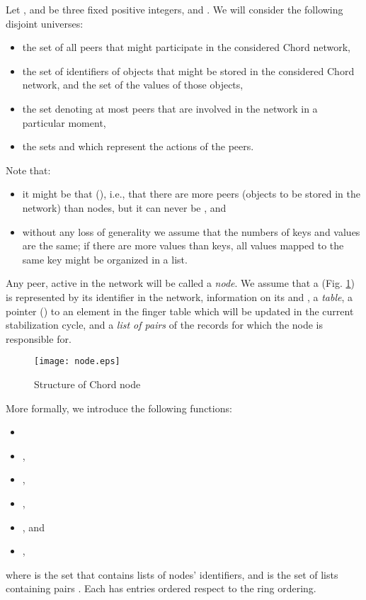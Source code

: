 \documentclass{amsart}
\theoremstyle{definition}
\begin{document}
Let ,  and  be three fixed positive integers, and . We will consider the following disjoint universes:
\begin{itemize}
    \item the set  of all peers that might participate in the considered Chord network,



    \item the set  of identifiers of objects that might be stored in the considered Chord network, and
    the set  of the values of those  objects,

    \item the set  denoting at most  peers that are involved in the network in a particular
    moment,

    \item the sets  and   which represent the actions of the
    peers.
\end{itemize}
Note that:
\begin{itemize}
    \item it might be that  (), i.e., that there are more peers (objects to be stored in the network) than nodes,
    but it can never be , and

    \item without any loss of generality we assume that the numbers of keys and values are the same; if there are more values than
    keys, all values mapped to the same key might be organized in a list.
\end{itemize}



Any peer, active in the network
will be called a {\em node}.
We assume that a  (Fig. \ref{node}) is represented by its identifier  in the network, information on its 
 and , a   {\em table}, a pointer () to an element in the finger table which will be updated
in the current stabilization cycle, and a {\em list of  pairs} of the records for which the node is responsible for.


\begin{figure}
\centering
\texttt{[image: node.eps]}

\caption{Structure of Chord node} \label{node}
\end{figure}

More formally, we introduce the following functions:
\begin{itemize}
    \item 
    \item ,
    \item ,
    \item ,
    \item , and
    \item ,
\end{itemize}
where  is the set that contains lists of nodes' identifiers, and  is the set of lists
containing pairs . Each  has  entries ordered respect to the ring ordering.
\end{document}

